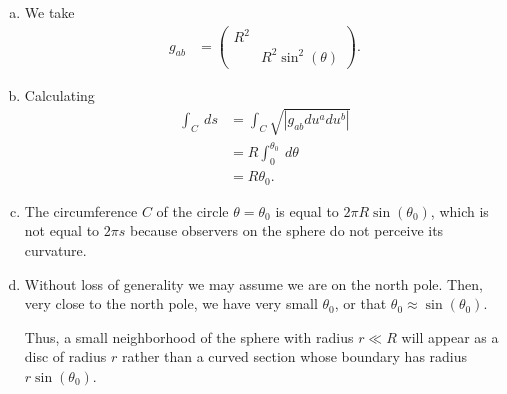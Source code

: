 \documentclass[10pt]{mypackage}
\begin{document}
\begin{solution}[30.21]\hfill
  \begin{enumerate}[(a)]
    \item We take
      \begin{align*}
        g_{ab} &= \begin{pmatrix}R^2 & \\ & R^2\sin^2\left( \theta \right)\end{pmatrix}.
      \end{align*}
    \item Calculating
      \begin{align*}
        \int_{C}^{} \:ds &= \int_{C}^{}\sqrt{\left\vert g_{ab}du^{a}du^{b} \right\vert}\\
                         &= R\int_{0}^{\theta_0} \:d\theta\\
                         &= R\theta_{0}.
      \end{align*}
    \item The circumference $C$ of the circle $\theta = \theta_0$ is equal to $2\pi R \sin\left( \theta_0 \right)$, which is not equal to $2\pi s$ because observers on the sphere do not perceive its curvature.
    \item Without loss of generality we may assume we are on the north pole. Then, very close to the north pole, we have very small $\theta_0$, or that $\theta_0\approx \sin\left( \theta_0 \right)$.\newline

      Thus, a small neighborhood of the sphere with radius $r \ll R$ will appear as a disc of radius $r$ rather than a curved section whose boundary has radius $r\sin\left( \theta_0 \right)$.
  \end{enumerate}
\end{solution}
\end{document}
